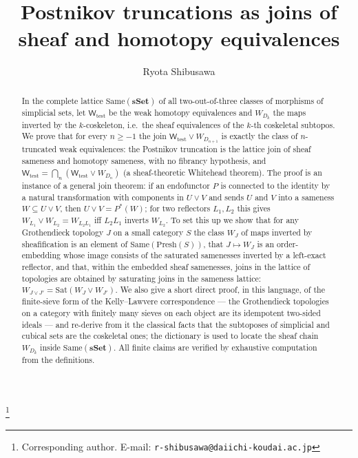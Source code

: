 \documentclass[11pt]{amsart}
\theoremstyle{definition}
\newcommand{\Same}{\mathrm{Same}}
\newcommand{\Presh}{\mathrm{Presh}}
\newcommand{\Wtest}{\mathsf{W}_{\mathrm{test}}}
\newcommand{\sset}{\mathbf{sSet}}
\begin{document}
\title[Postnikov truncations as joins]{Postnikov truncations as joins of
  sheaf and homotopy equivalences}
\author{Ryota Shibusawa}
\thanks{Corresponding author. E-mail: \texttt{r-shibusawa@daiichi-koudai.ac.jp}}
\address{Daiichi Institute of Technology}

\begin{abstract}
In the complete lattice $\Same(\sset)$ of all two-out-of-three classes of
morphisms of simplicial sets, let $\Wtest$ be the weak homotopy equivalences
and $W_{D_k}$ the maps inverted by the $k$-coskeleton, i.e.\ the sheaf
equivalences of the $k$-th coskeletal subtopos. We prove that for every
$n\ge-1$ the join $\Wtest\vee W_{D_{n+1}}$ is exactly the class of
$n$-truncated weak equivalences: the Postnikov truncation is the lattice join
of sheaf sameness and homotopy sameness, with no fibrancy hypothesis, and
$\Wtest=\bigcap_n(\Wtest\vee W_{D_n})$ (a sheaf-theoretic Whitehead theorem).
The proof is an instance of a general join theorem: if an endofunctor $P$ is
connected to the identity by a natural transformation with components in
$U\vee V$ and sends $U$ and $V$ into a sameness $W\subseteq U\vee V$, then
$U\vee V=P^{*}(W)$; for two reflectors $L_1,L_2$ this gives
$W_{L_1}\vee W_{L_2}=W_{L_2L_1}$ iff $L_2L_1$ inverts $W_{L_2}$. To set this
up we show that for any Grothendieck topology $J$ on a small category $S$ the
class $W_J$ of maps inverted by sheafification is an element of
$\Same(\Presh(S))$, that $J\mapsto W_J$ is an order-embedding whose image
consists of the saturated samenesses inverted by a left-exact reflector, and
that, within the embedded sheaf samenesses, joins in the lattice of
topologies are obtained by saturating joins in the sameness lattice:
$W_{J\vee J'}=\mathrm{Sat}(W_J\vee W_{J'})$. We also give a short direct proof, in this language, of the
finite-sieve form of the Kelly--Lawvere correspondence --- the Grothendieck
topologies on a category with finitely many sieves on each object are its
idempotent two-sided ideals --- and re-derive from it the classical facts that
the subtoposes of simplicial and cubical sets are the coskeletal ones; the
dictionary is used to locate the sheaf chain $W_{D_k}$ inside
$\Same(\sset)$. All finite claims are verified by exhaustive computation from
the definitions.
\end{abstract}
\end{document}
